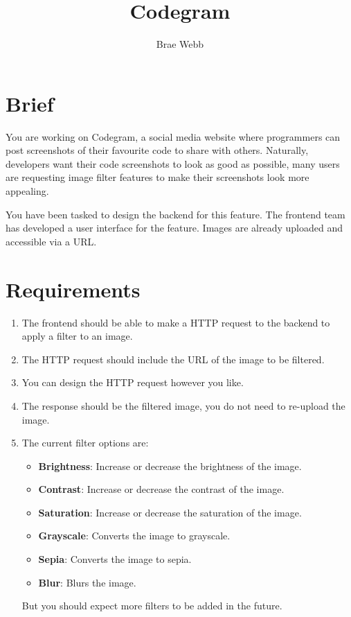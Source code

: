 \documentclass{csse4400}
\title{Codegram}
\author{Brae Webb}
\date{\week{2}}
\begin{document}
\maketitle

\section{Brief}

You are working on Codegram,
a social media website where programmers can post screenshots of their favourite code to share with others.
Naturally, developers want their code screenshots to look as good as possible,
many users are requesting image filter features to make their screenshots look more appealing.

You have been tasked to design the backend for this feature.
The frontend team has developed a user interface for the feature.
Images are already uploaded and accessible via a URL.

\section{Requirements}

\begin{enumerate}
    \item The frontend should be able to make a HTTP request to the backend to apply a filter to an image.
    \item The HTTP request should include the URL of the image to be filtered.
    \item You can design the HTTP request however you like.
    \item The response should be the filtered image, you do not need to re-upload the image.
    \item The current filter options are:
    \begin{itemize}
        \item \textbf{Brightness}: Increase or decrease the brightness of the image.
        \item \textbf{Contrast}: Increase or decrease the contrast of the image.
        \item \textbf{Saturation}: Increase or decrease the saturation of the image.
        \item \textbf{Grayscale}: Converts the image to grayscale.
        \item \textbf{Sepia}: Converts the image to sepia.
        \item \textbf{Blur}: Blurs the image.
    \end{itemize}
        But you should expect more filters to be added in the future.
\end{enumerate}
\end{document}
